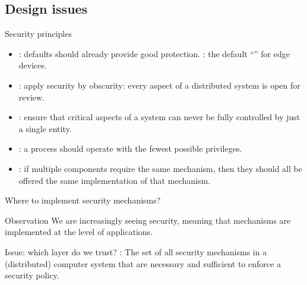 \subsection{Design issues}
\begin{slide}{Security principles}
  \begin{itemize}
  \item {}: defaults should already provide good protection. :
    the default ``'' for edge devices. 
  \item {}:  apply security by obscurity: every aspect of a distributed system is
    open for review.
  \item {}: ensure that critical aspects of a system can never be fully controlled
    by just a single entity.
  \item {}: a process should operate with the fewest possible privileges.
  \item{}: if multiple components require the same mechanism, then they should all
    be offered the same implementation of that mechanism.
  \end{itemize}
\end{slide}
\begin{slide}{Where to implement security mechanisms?}
  \begin{centerfig}
  \end{centerfig}

  \begin{block}{Observation}
    We are increasingly seeing  security, meaning that mechanisms are implemented at the level
    of applications.
  \end{block}

  \begin{block}{Issue: which layer do we trust?}
    : The set of all security mechanisms in a (distributed) computer system that
    are necessary and sufficient to enforce a security policy.
  \end{block}
\end{slide}
